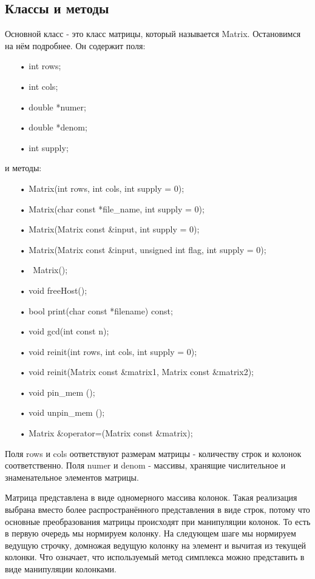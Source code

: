\documentclass[a4paper,14pt,russian]{extreport}
\begin{document}
\subsection{Классы и методы}
Основной класс - это класс матрицы, который называется Matrix. Остановимся на нём подробнее. Он содержит поля:
\begin{itemize}
\item[•] int rows;
\item[•] int cols;
\item[•] double *numer;
\item[•] double *denom;
\item[•] int supply;
\end{itemize}
и методы:
\begin{itemize}
\item[•] Matrix(int rows, int cols, int supply = 0);
\item[•] Matrix(char const *file\_name, int supply = 0);
\item[•] Matrix(Matrix const \&input, int supply = 0);
\item[•] Matrix(Matrix const \&input, unsigned int flag, int supply = 0);
\item[•] ~Matrix();
\item[•] void freeHost();
\item[•] bool print(char const *filename) const;
\item[•] void gcd(int const n);
\item[•] void reinit(int rows, int cols, int supply = 0);
\item[•] void reinit(Matrix const \&matrix1, Matrix const \&matrix2);
\item[•] void pin\_mem ();
\item[•] void unpin\_mem ();
\item[•] Matrix \&operator=(Matrix const \&matrix);
\end{itemize}
\par
Поля rows и cols оответствуют размерам матрицы - количеству строк и колонок соответственно. Поля numer и denom - массивы, хранящие числительное и знаменательное элементов матрицы.
\par
Матрица представлена в виде одномерного массива колонок. Такая реализация выбрана вместо более распространённого представления в виде строк, потому что основные преобразования матрицы происходят при манипуляции колонок. То есть в первую очередь мы нормируем колонку. На следующем шаге мы нормируем ведущую строчку, домножая ведущую колонку на элемент и вычитая из текущей колонки. Что означает, что используемый метод симплекса можно представить в виде манипуляции колонками.
\end{document}
